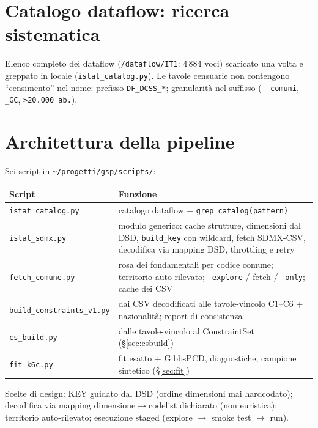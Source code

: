 \documentclass[11pt,a4paper]{article}
\newcommand{\code}[1]{\texttt{#1}}
\newcommand{\flow}[1]{\texttt{\small #1}}
\begin{document}
\section{Catalogo dataflow: ricerca sistematica}
Elenco completo dei dataflow (\code{/dataflow/IT1}: 4\,884 voci) scaricato una
volta e greppato in locale (\code{istat\_catalog.py}). Le tavole censuarie non
contengono ``censimento'' nel nome: prefisso \flow{DF\_DCSS\_*}; granularit\`a
nel suffisso (\flow{- comuni}, \flow{\_GC}, \flow{>20.000 ab.}).

\section{Architettura della pipeline}
Sei script in \code{\textasciitilde/progetti/gsp/scripts/}:
\begin{center}
\begin{tabular}{@{}lp{9.6cm}@{}}
\toprule
\textbf{Script} & \textbf{Funzione}\\
\midrule
\code{istat\_catalog.py} & catalogo dataflow + \code{grep\_catalog(pattern)}\\
\code{istat\_sdmx.py} & modulo generico: cache strutture, dimensioni dal DSD, \code{build\_key} con wildcard, fetch SDMX-CSV, decodifica via mapping DSD, throttling e retry\\
\code{fetch\_comune.py} & rosa dei fondamentali per codice comune; territorio auto-rilevato; \code{--explore} / fetch / \code{--only}; cache dei CSV\\
\code{build\_constraints\_v1.py} & dai CSV decodificati alle tavole-vincolo C1--C6 + nazionalit\`a; report di consistenza\\
\code{cs\_build.py} & dalle tavole-vincolo al ConstraintSet (\S\ref{sec:csbuild})\\
\code{fit\_k6c.py} & fit esatto + GibbsPCD, diagnostiche, campione sintetico (\S\ref{sec:fit})\\
\bottomrule
\end{tabular}
\end{center}
\noindent Scelte di design: KEY guidato dal DSD (ordine dimensioni mai
hardcodato); decodifica via mapping dimensione$\to$codelist dichiarato (non
euristica); territorio auto-rilevato; esecuzione staged (explore $\to$ smoke
test $\to$ run).

\end{document}
